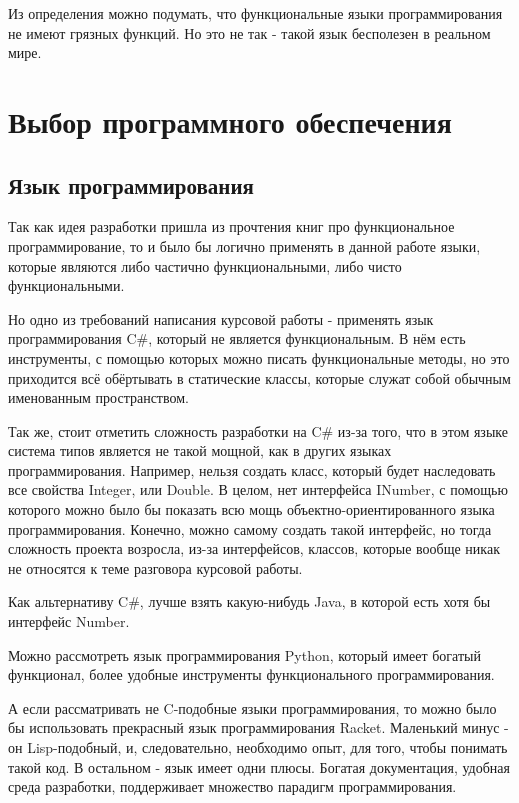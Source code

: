 Из определения можно подумать, что функциональные языки программирования не имеют грязных функций. 
Но это не так - такой язык бесполезен в реальном мире.

\newpage
\section{Выбор программного обеспечения}

\subsection{Язык программирования}

Так как идея разработки пришла из прочтения книг про функциональное программирование, то и было бы логично применять в данной работе языки, которые являются либо частично функциональными, либо чисто функциональными.

Но одно из требований написания курсовой работы - применять язык программирования C\#, который не является функциональным. В нём есть инструменты, с помощью которых можно писать функциональные методы, но это приходится всё обёртывать в статические классы, которые служат собой обычным именованным пространством.

Так же, стоит отметить сложность разработки на C\# из-за того, что в этом языке система типов является не такой мощной, как в других языках программирования. Например, нельзя создать класс, который будет наследовать все свойства Integer, или Double. В целом, нет интерфейса INumber, с помощью которого можно было бы показать всю мощь объектно-ориентированного языка программирования. Конечно, можно самому создать такой интерфейс, но тогда сложность проекта возросла, из-за интерфейсов, классов, которые вообще никак не относятся к теме разговора курсовой работы.

Как альтернативу C\#, лучше взять какую-нибудь Java, в которой есть хотя бы интерфейс Number.

Можно рассмотреть язык программирования Python, который имеет богатый функционал, более удобные инструменты функционального программирования. 

А если рассматривать не C-подобные языки программирования, то можно было бы использовать прекрасный язык программирования Racket. Маленький минус - он Lisp-подобный, и, следовательно, необходимо опыт, для того, чтобы понимать такой код. В остальном - язык имеет одни плюсы. Богатая документация, удобная среда разработки, поддерживает множество парадигм программирования.

